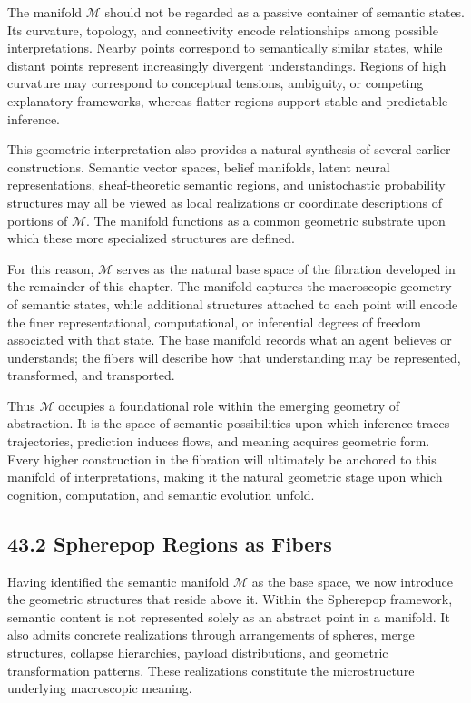 \documentclass[12pt,letterpaper]{article}
\theoremstyle{remark}
\begin{document}
The manifold $\mathcal{M}$ should not be regarded as a passive container of semantic states. Its curvature, topology, and connectivity encode relationships among possible interpretations. Nearby points correspond to semantically similar states, while distant points represent increasingly divergent understandings. Regions of high curvature may correspond to conceptual tensions, ambiguity, or competing explanatory frameworks, whereas flatter regions support stable and predictable inference.

This geometric interpretation also provides a natural synthesis of several earlier constructions. Semantic vector spaces, belief manifolds, latent neural representations, sheaf-theoretic semantic regions, and unistochastic probability structures may all be viewed as local realizations or coordinate descriptions of portions of $\mathcal{M}$. The manifold functions as a common geometric substrate upon which these more specialized structures are defined.

For this reason, $\mathcal{M}$ serves as the natural base space of the fibration developed in the remainder of this chapter. The manifold captures the macroscopic geometry of semantic states, while additional structures attached to each point will encode the finer representational, computational, or inferential degrees of freedom associated with that state. The base manifold records what an agent believes or understands; the fibers will describe how that understanding may be represented, transformed, and transported.

Thus $\mathcal{M}$ occupies a foundational role within the emerging geometry of abstraction. It is the space of semantic possibilities upon which inference traces trajectories, prediction induces flows, and meaning acquires geometric form. Every higher construction in the fibration will ultimately be anchored to this manifold of interpretations, making it the natural geometric stage upon which cognition, computation, and semantic evolution unfold.

\subsection{43.2 Spherepop Regions as Fibers}

Having identified the semantic manifold $\mathcal{M}$ as the base space, we now introduce the geometric structures that reside above it. Within the Spherepop framework, semantic content is not represented solely as an abstract point in a manifold. It also admits concrete realizations through arrangements of spheres, merge structures, collapse hierarchies, payload distributions, and geometric transformation patterns. These realizations constitute the microstructure underlying macroscopic meaning.
\end{document}
